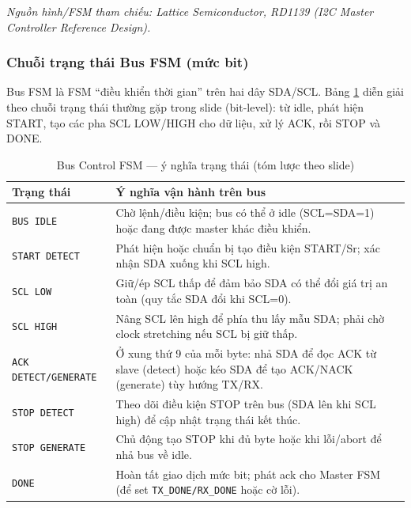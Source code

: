 \textit{\small Nguồn hình/FSM tham chiếu: Lattice Semiconductor, RD1139 (I2C Master Controller Reference Design).}

\subsubsection{Chuỗi trạng thái Bus FSM (mức bit)}
Bus FSM là FSM ``điều khiển thời gian'' trên hai dây SDA/SCL. Bảng \ref{tab:bus_fsm_states} diễn giải theo chuỗi trạng thái thường gặp trong slide (bit-level): từ idle, phát hiện START, tạo các pha SCL LOW/HIGH cho dữ liệu, xử lý ACK, rồi STOP và DONE.

\begin{table}[H]
    \centering
    \caption{Bus Control FSM --- ý nghĩa trạng thái (tóm lược theo slide)}
    \label{tab:bus_fsm_states}
    \begin{tabularx}{\textwidth}{|l|X|}
        \hline
        \textbf{Trạng thái} & \textbf{Ý nghĩa vận hành trên bus} \\
        \hline
        \texttt{BUS IDLE} & Chờ lệnh/điều kiện; bus có thể ở idle (SCL=SDA=1) hoặc đang được master khác điều khiển. \\
        \hline
        \texttt{START DETECT} & Phát hiện hoặc chuẩn bị tạo điều kiện START/Sr; xác nhận SDA xuống khi SCL high. \\
        \hline
        \texttt{SCL LOW} & Giữ/ép SCL thấp để đảm bảo SDA có thể đổi giá trị an toàn (quy tắc SDA đổi khi SCL=0). \\
        \hline
        \texttt{SCL HIGH} & Nâng SCL lên high để phía thu lấy mẫu SDA; phải chờ clock stretching nếu SCL bị giữ thấp. \\
        \hline
        \texttt{ACK DETECT/GENERATE} & Ở xung thứ 9 của mỗi byte: nhả SDA để đọc ACK từ slave (detect) hoặc kéo SDA để tạo ACK/NACK (generate) tùy hướng TX/RX. \\
        \hline
        \texttt{STOP DETECT} & Theo dõi điều kiện STOP trên bus (SDA lên khi SCL high) để cập nhật trạng thái kết thúc. \\
        \hline
        \texttt{STOP GENERATE} & Chủ động tạo STOP khi đủ byte hoặc khi lỗi/abort để nhả bus về idle. \\
        \hline
        \texttt{DONE} & Hoàn tất giao dịch mức bit; phát ack cho Master FSM (để set \texttt{TX\_DONE/RX\_DONE} hoặc cờ lỗi). \\
        \hline
    \end{tabularx}
\end{table}

